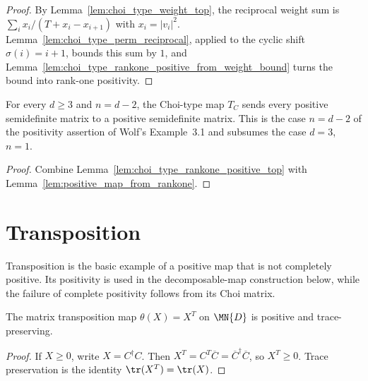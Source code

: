 \begin{proof}
    \leanok
    By Lemma~\ref{lem:choi_type_weight_top}, the reciprocal weight sum is
    $\sum_i x_i/(T+x_i-x_{i+1})$ with $x_i=|v_i|^2$.
    Lemma~\ref{lem:choi_type_perm_reciprocal}, applied to the cyclic shift
    $\sigma(i)=i+1$, bounds this sum by $1$, and
    Lemma~\ref{lem:choi_type_rankone_positive_from_weight_bound} turns the
    bound into rank-one positivity.
\end{proof}

\begin{theorem}
    \label{thm:choi_type_positive_top}
    \leanok
    For every $d\ge3$ and $n=d-2$, the Choi-type map $T_C$ sends every
    positive semidefinite matrix to a positive semidefinite matrix. This is
    the case $n=d-2$ of the positivity assertion of Wolf's Example~3.1 and
    subsumes the case $d=3$, $n=1$.
\end{theorem}

\begin{proof}
    \leanok
    Combine Lemma~\ref{lem:choi_type_rankone_positive_top} with
    Lemma~\ref{lem:positive_map_from_rankone}.
\end{proof}

\section{Transposition}

Transposition is the basic example of a positive map that is not completely
positive. Its positivity is used in the decomposable-map construction below,
while the failure of complete positivity follows from its Choi matrix.

\begin{theorem}
    \label{thm:transpose_positive_trace_preserving}
    \leanok
    The matrix transposition map $\theta(X)=X^T$ on $\MN{D}$ is positive
    and trace-preserving.
\end{theorem}

\begin{proof}\leanok
    If $X \ge 0$, write $X=C^\dagger C$. Then
    $X^T=C^T\overline C=\overline C^\dagger\overline C$, so $X^T \ge 0$.
    Trace preservation is the identity $\tr(X^T)=\tr(X)$.
\end{proof}

